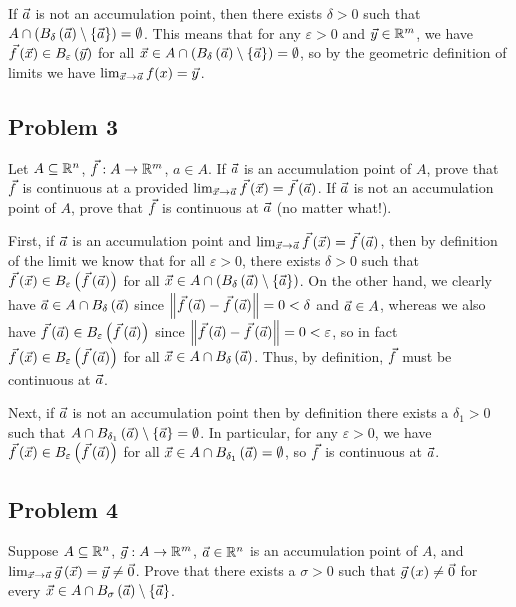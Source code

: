 \documentclass[main.tex]{subfiles}
\begin{document}
\begin{soln}
    If $\vec{a}$ is not an accumulation point, then there exists $\delta > 0$ such that $A \cap \left( B_\delta\left( \vec{a} \right)\setminus \left\{ \vec{a} \right\} \right)= \emptyset$. This means that for any $\varepsilon > 0$ and $\vec{y}\in \mathbb R^m$, we have $\vec{f}\left( \vec{x} \right)\in B_\varepsilon\left( \vec{y} \right)$ for all $\vec{x}\in A\cap \left( B_\delta\left( \vec{a} \right) \setminus \left\{ \vec{a} \right\} \right) = \emptyset$, so by the geometric definition of limits we have $\lim_{\vec{x}\to \vec{a}} f(x) = \vec{y}$.
\end{soln}
\eject

\subsection{Problem 3}
\begin{claim}
    Let $A \subseteq \mathbb R^n$, $\vec{f} : A \to \mathbb R^m$, $a \in A$. If $\vec{a}$ is an accumulation point of $A$, prove that $\vec{f}$ is continuous at a provided $\lim_{\vec{x}\to \vec{a}} \vec{f}\left( \vec{x} \right) = \vec{f}\left( \vec{a} \right)$. If $\vec{a}$ is not an accumulation point of $A$, prove that $\vec{f}$ is continuous at $\vec{a}$ (no matter what!).
\end{claim}

\begin{soln}
    First, if $\vec{a}$ is an accumulation point and $\lim_{\vec{x}\to \vec{a}}\vec{f}\left( \vec{x} \right) = \vec{f}\left( \vec{a} \right)$, then by definition of the limit we know that for all $\varepsilon > 0$, there exists $\delta > 0$ such that $\vec{f}\left( \vec{x} \right)\in B_\varepsilon\left( \vec{f}\left( \vec{a} \right) \right)$ for all $\vec{x}\in A\cap \left( B_\delta\left( \vec{a} \right)\setminus \left\{ \vec{a} \right\} \right)$. On the other hand, we clearly have $\vec{a}\in A \cap B_\delta\left( \vec{a} \right)$ since $\left\lVert \vec{f}\left( \vec{a} \right) - \vec{f}\left( \vec{a} \right) \right\rVert = 0 < \delta$ and $\vec{a}\in A$, whereas we also have $\vec{f}\left( \vec{a} \right)\in B_\varepsilon\left( \vec{f}\left( \vec{a} \right) \right)$ since $\left\lVert \vec{f}\left( \vec{a} \right) - \vec{f}\left( \vec{a} \right) \right\rVert = 0 < \varepsilon$, so in fact $\vec{f}\left( \vec{x} \right)\in B_\varepsilon\left( \vec{f}\left( \vec{a} \right) \right)$ for all $\vec{x}\in A\cap B_\delta\left( \vec{a} \right)$. Thus, by definition, $\vec{f}$ must be continuous at $\vec{a}$.

    Next, if $\vec{a}$ is not an accumulation point then by definition there exists a $\delta_1 > 0$ such that $A\cap B_{\delta_1}\left( \vec{a} \right)\setminus\left\{ \vec{a} \right\} = \emptyset$. In particular, for any $\varepsilon > 0$, we have $\vec{f}\left( \vec{x} \right)\in B_\varepsilon\left( \vec{f}\left( \vec{a} \right) \right)$ for all $\vec{x}\in A\cap B_{\delta_1}\left( \vec{a} \right) = \emptyset$, so $\vec{f}$ is continuous at $\vec{a}$.
\end{soln}
\eject

\subsection{Problem 4}
\begin{claim}
    Suppose $A \subseteq \mathbb R^n$, $\vec{g} : A \to \mathbb R^m$, $\vec{a} \in \mathbb R^n$ is an accumulation point of $A$, and $\lim_{\vec{x}\to \vec{a}} \vec{g}\left( \vec{x} \right) = \vec{y} \neq \vec{0}$. Prove that there exists a $\sigma > 0$ such that $\vec{g}\left( x \right) \neq \vec{0}$ for every $\vec{x} \in A \cap B_\sigma\left( \vec{a} \right) \setminus \left\{ \vec{a} \right\}$.
\end{claim}
\end{document}

